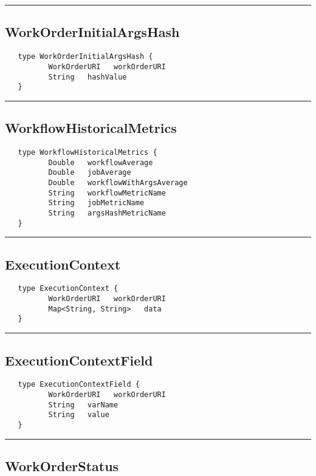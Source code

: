 \rule{15cm}{2pt}
\subsection{WorkOrderInitialArgsHash}
\label{type:WorkOrderInitialArgsHash}

\begin{verbatim}
   type WorkOrderInitialArgsHash {
          WorkOrderURI   workOrderURI
          String   hashValue
   }
\end{verbatim}

\rule{15cm}{2pt}
\subsection{WorkflowHistoricalMetrics}
\label{type:WorkflowHistoricalMetrics}

\begin{verbatim}
   type WorkflowHistoricalMetrics {
          Double   workflowAverage
          Double   jobAverage
          Double   workflowWithArgsAverage
          String   workflowMetricName
          String   jobMetricName
          String   argsHashMetricName
   }
\end{verbatim}

\rule{15cm}{2pt}
\subsection{ExecutionContext}
\label{type:ExecutionContext}

\begin{verbatim}
   type ExecutionContext {
          WorkOrderURI   workOrderURI
          Map<String, String>   data
   }
\end{verbatim}

\rule{15cm}{2pt}
\subsection{ExecutionContextField}
\label{type:ExecutionContextField}

\begin{verbatim}
   type ExecutionContextField {
          WorkOrderURI   workOrderURI
          String   varName
          String   value
   }
\end{verbatim}

\rule{15cm}{2pt}
\subsection{WorkOrderStatus}
\label{type:WorkOrderStatus}

